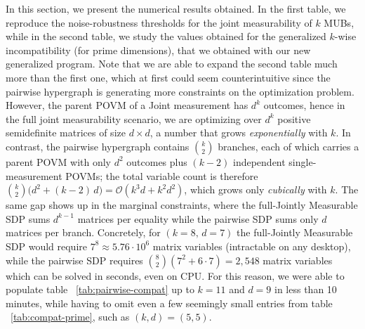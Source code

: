 \documentclass[oneside, a4paper, onecolumn, 11pt]{article}
\theoremstyle{definition}
\theoremstyle{plain}
\theoremstyle{remark}
\begin{document}
In this section, we present the numerical results obtained. In the first table, we reproduce the noise-robustness thresholds for the joint measurability of $k$ MUBs, while in the second 
table, we study the values obtained for the generalized $k$-wise incompatibility (for prime dimensions), that we obtained with our new generalized program.
Note that we are able to expand the second table much more than the first one, which at first could seem counterintuitive since the pairwise hypergraph is generating more constraints on the optimization problem.
\newline However, the parent POVM of a Joint measurement has $d^k$ outcomes, hence in the full joint measurability scenario, we are optimizing over $d^k$ positive semidefinite matrices
of size $d \times d$, a number that grows \emph{exponentially} with $k$.
In contrast, the pairwise hypergraph contains $\binom{k}{2}$ branches,
each of which carries a parent POVM with only $d^2$ outcomes plus
$(k-2)$ independent single-measurement POVMs; the total variable count
is therefore $\binom{k}{2}\bigl(d^2 + (k-2)\,d\bigr) = \mathcal{O}(k^3 d + k^2 d^2)$,
which grows only \emph{cubically} with $k$. The same gap shows up in
the marginal constraints, where the full-Jointly Measurable SDP sums $d^{k-1}$ matrices
per equality while the pairwise SDP sums only $d$ matrices per branch.
Concretely, for $(k=8,\, d=7)$ the full-Jointly Measurable SDP would require
$7^{8} \approx 5.76 \cdot 10^{6}$ matrix variables (intractable on any
desktop), while the pairwise SDP requires
$\binom{8}{2}(7^{2} + 6\cdot 7) = 2{,}548$ matrix variables which can
be solved in seconds, even on CPU. For this reason, we were able to 
populate table ~\ref{tab:pairwise-compat} up to $k = 11$ and $d = 9$ in less than 10 minutes, 
while having to omit even a few seemingly small entries from table ~\ref{tab:compat-prime}, such as $(k, d) = (5,5)$.
\end{document}
